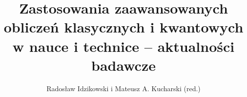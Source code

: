 \documentclass[11pt,twoside]{book}
\newcounter{algorithms_counter}
\begin{document}

\author{Radosław Idzikowski i Mateusz A. Kucharski (red.)}
\title{Zastosowania zaawansowanych obliczeń klasycznych i kwantowych w nauce i technice -- aktualności badawcze}
\date{}

\setcounter{page}{1}
\pagestyle{empty}

\maketitle




%
%

%
%
\setcounter{tocdepth}{1}

\clearpage
\thispagestyle{empty}   %
\pagestyle{headings}    %
\tableofcontents


%












%
%
% 












\backmatter%
%
%



	
\end{document}
